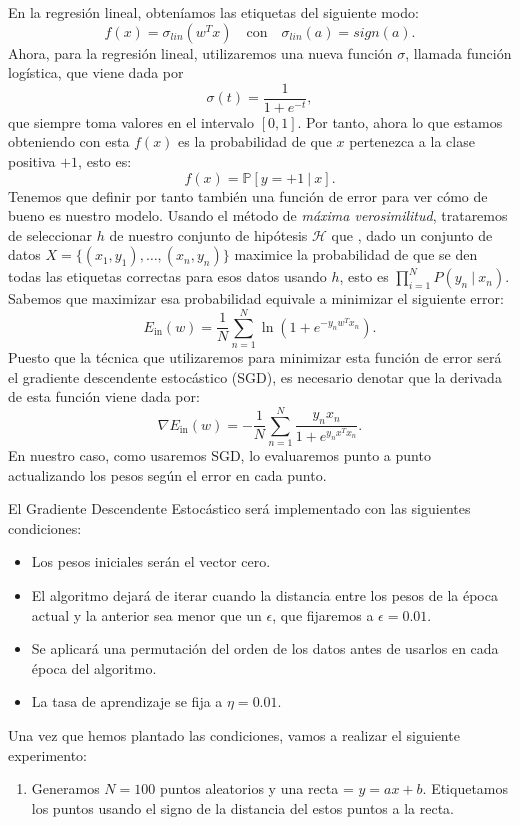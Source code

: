\documentclass[12pt]{article}
\begin{document}
{En la regresión lineal, obteníamos las etiquetas del siguiente modo:
$$
f(x) = \sigma_{lin}(w^T x) \quad \text{con} \quad \sigma_{lin}(a) = sign(a).
$$
Ahora, para la regresión lineal, utilizaremos una nueva función $\sigma$, llamada función logística, que viene dada por 
$$
\sigma(t) = \frac{1}{1 + e^{-t}},
$$
que siempre toma valores en el intervalo $[0,1]$. Por tanto, ahora lo que estamos obteniendo con esta $f(x)$ es la probabilidad de que $x$ pertenezca a la clase positiva $+1$, esto es:
$$
f(x) = \mathbb P [ y = +1 \ | \ x].
$$
Tenemos que definir por tanto también una función de error para ver cómo de bueno es nuestro modelo. Usando el método de \emph{máxima verosimilitud}, trataremos de seleccionar $h$ de nuestro conjunto de hipótesis $\mathcal H$ que , dado un conjunto de datos $X = \{(x_1,y_1),\dots,(x_n,y_n)\}$ maximice la probabilidad de que se den todas las etiquetas correctas para esos datos usando $h$, esto es $\prod_{i = 1}^N P(y_n \ | \ x_n)$. Sabemos que maximizar esa probabilidad equivale a minimizar el siguiente error:
\[
E_{\operatorname{in}}(w) = \frac{1}{N} \sum_{n=1}^N \ln \left( 1 + e^{-y_n w^T x_n}\right).  
\]
Puesto que la técnica que utilizaremos para minimizar esta función de error será el gradiente descendente estocástico (SGD), es necesario denotar que la derivada de esta función viene dada por:
\[
\nabla E_{\operatorname{in}}(w) = - \frac{1}{N} \sum_{n = 1}^N \frac{y_n x_n}{ 1 + e^{y_n x^T x_n}}.
\]
En nuestro caso, como usaremos SGD, lo evaluaremos punto a punto actualizando los pesos según el error en cada punto. 

El Gradiente Descendente Estocástico será implementado con las siguientes condiciones:
\begin{itemize}
  \item Los pesos iniciales serán el vector cero.
  \item El algoritmo dejará de iterar cuando la distancia entre los pesos de la época actual y la anterior sea menor que un $\epsilon$, que fijaremos a $\epsilon = 0.01$.
  \item Se aplicará una permutación del orden de los datos antes de usarlos en cada época del algoritmo.
  \item La tasa de aprendizaje se fija a $\eta = 0.01$.
\end{itemize}


Una vez que hemos plantado las condiciones, vamos a realizar el siguiente experimento: 
\begin{enumerate}
\item Generamos $N = 100$ puntos aleatorios y una recta = $y = ax + b$. Etiquetamos los puntos usando el signo de la distancia del estos puntos a la recta.


\end{enumerate}}
\end{document}
